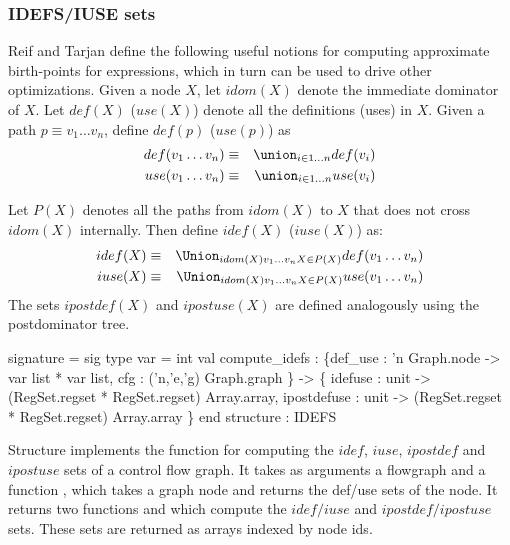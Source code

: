\subsubsection{IDEFS/IUSE sets}
Reif and Tarjan define the following useful notions for
computing approximate birth-points for expressions,  which in turn
can be used to drive other optimizations.
Given a node $X$, let $idom(X)$ denote the immediate dominator of $X$.
Let $def(X)$ ($use(X)$) denote all the definitions (uses) in $X$. 
Given a path $p \equiv v_1\ldots v_n$, define $def(p)$ ($use(p)$) as
\begin{eqnarray*}
   def(v_1\ldots v_n) & \equiv &\union_{i \in 1 \ldots n} def(v_i) \\
   use(v_1\ldots v_n) & \equiv &\union_{i \in 1 \ldots n} use(v_i)
\end{eqnarray*}

Let $P(X)$ denotes all the paths from $idom(X)$ to $X$
that does not cross $idom(X)$ internally.    Then define
$idef(X)$ ($iuse(X)$) as:
\begin{eqnarray*}
  idef(X) & \equiv & \Union_{idom(X) v_1 \ldots v_n X \in P(X)} 
     def(v_1\ldots v_n) \\
  iuse(X) & \equiv & \Union_{idom(X) v_1 \ldots v_n X \in P(X)} 
     use(v_1\ldots v_n) 
\end{eqnarray*}
The sets $ipostdef(X)$ and $ipostuse(X)$ are defined analogously
using the postdominator tree.

\begin{SML}
 signature  = sig
   type var = int
   val compute_idefs : 
       \{def_use : 'n Graph.node -> var list * var list,
        cfg     : ('n,'e,'g) Graph.graph
       \} ->
       \{ idefuse      : unit -> (RegSet.regset * RegSet.regset) Array.array,
         ipostdefuse  : unit -> (RegSet.regset * RegSet.regset) Array.array
       \}
 end
 structure  : IDEFS
\end{SML}
Structure  implements the function 
 for computing
the $idef$, $iuse$, $ipostdef$ and $ipostuse$ sets of a control flow
graph.  It takes as arguments a flowgraph and a function , which
takes a graph node and returns the def/use sets of the node.
It returns two functions  and  which
compute the $idef/iuse$ and $ipostdef/ipostuse$ sets.  These sets
are returned as arrays indexed by node ids.
